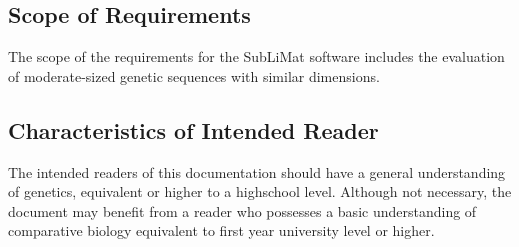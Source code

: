 \documentclass[12pt]{article}
\begin{document}
\subsection{Scope of Requirements} 

The scope of the requirements for the SubLiMat software includes the evaluation of 
moderate-sized genetic sequences with similar dimensions. 




\subsection{Characteristics of Intended Reader} \label{sec_IntendedReader}

The intended readers of this documentation should have a general understanding of genetics, 
equivalent or higher to a highschool level. Although not necessary, the document may benefit
from a reader who possesses a basic understanding of comparative biology equivalent to first 
year university level or higher.  

\end{document}
